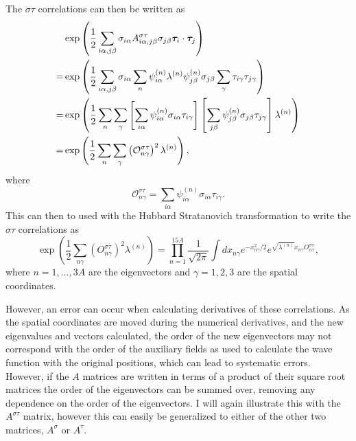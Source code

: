 The $\sigma\tau$ correlations can then be written as
\begin{align}
   &\exp\left(\frac{1}{2}\sum\limits_{i\alpha,j\beta} \sigma_{i\alpha}A^{\sigma\tau}_{i\alpha,j\beta}\sigma_{j\beta}\bm{\tau}_i\cdot\bm{\tau}_j\right) \\
   =& \exp\left(\frac{1}{2}\sum\limits_{i\alpha,j\beta} \sigma_{i\alpha}\sum\limits_n \psi^{(n)}_{i\alpha}\lambda^{(n)}\psi^{(n)}_{j\beta}\sigma_{j\beta}\sum\limits_\gamma\tau_{i\gamma}\tau_{j\gamma}\right) \\
   =& \exp\left(\frac{1}{2}\sum\limits_n\sum\limits_\gamma\left[\sum\limits_{i\alpha} \psi^{(n)}_{i\alpha}\sigma_{i\alpha}\tau_{i\gamma}\right] \left[\sum\limits_{j\beta}\psi^{(n)}_{j\beta}\sigma_{j\beta}\tau_{j\gamma}\right] \lambda^{(n)}\right) \\
   =& \exp\left(\frac{1}{2}\sum\limits_n\sum\limits_\gamma\left(\mathcal{O}^{\sigma\tau}_{n\gamma}\right)^2 \lambda^{(n)}\right),
\end{align}
where
\begin{equation}
   \mathcal{O}^{\sigma\tau}_{n\gamma} = \sum\limits_{i\alpha} \psi^{(n)}_{i\alpha}\sigma_{i\alpha}\tau_{i\gamma}.
\end{equation}
This can then to used with the Hubbard Stratanovich transformation to write the $\sigma\tau$ correlations as
\begin{equation}
   \exp\left(\frac{1}{2}\sum\limits_{n\gamma} \left(O^{\sigma\tau}_{n\gamma}\right)^2 \lambda^{(n)}\right) = \prod\limits_{n=1}^{15A} \frac{1}{\sqrt{2\pi}}\int dx_{n\gamma} e^{-x_{n\gamma}^2/2}e^{\sqrt{\lambda^{(n)}}x_{n\gamma}O_{n\gamma}^{\sigma\tau}},
\end{equation}
where $n=1,\ldots,3A$ are the eigenvectors and $\gamma=1,2,3$ are the spatial coordinates.

However, an error can occur when calculating derivatives of these correlations. As the spatial coordinates are moved during the numerical derivatives, and the new eigenvalues and vectors calculated, the order of the new eigenvectors may not correspond with the order of the auxiliary fields as used to calculate the wave function with the original positions, which can lead to systematic errors. However, if the $A$ matrices are written in terms of a product of their square root matrices the order of the eigenvectors can be summed over, removing any dependence on the order of the eigenvectors. I will again illustrate this with the $A^{\sigma\tau}$ matrix, however this can easily be generalized to either of the other two matrices, $A^\sigma$ or $A^\tau$.

